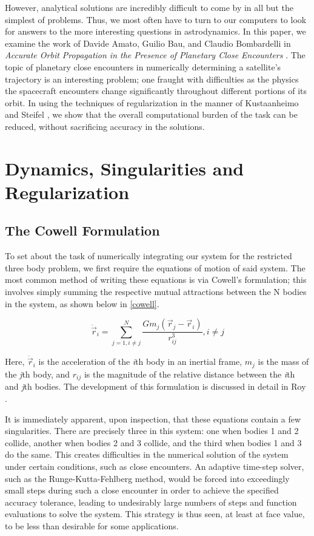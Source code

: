 \documentclass[11pt,twoside,letterpaper]{article}
\begin{document}
    However, analytical solutions are incredibly difficult to come by
    in all but the simplest of problems. Thus, we most often have to
    turn to our computers to look for answers to the more interesting
    questions in astrodynamics. In this paper, we examine the work of
    Davide Amato, Guilio Bau, and Claudio Bombardelli in \textit{Accurate
    Orbit Propagation in the Presence of Planetary Close Encounters}
    \cite{amato_2017}. The topic of planetary close encounters in
    numerically determining a satellite’s trajectory is an interesting
    problem; one fraught with difficulties as the physics the
    spacecraft encounters change significantly throughout different
    portions of its orbit. In using the techniques of regularization
    in the manner of Kustaanheimo and Steifel \cite{stiefel_1971}, we
    show that the overall computational burden of the task can be
    reduced, without sacrificing accuracy in the solutions.
    
  \section{Dynamics, Singularities and Regularization}
  
  \subsection {The Cowell Formulation} 
  To set about the task of numerically integrating our system for the
  restricted three body problem, we first require the equations of
  motion of said system. The most common method of writing these
  equations is via Cowell's formulation; this involves simply summing
  the respective mutual attractions between the N bodies in the
  system, as shown below in \ref{cowell}. 
  
  \begin{equation} \label{cowell}
    \ddot{\vec{r}}_i = \sum_{j=1, i\neq j}^{N} \frac{Gm_j\left(\vec{r}_j - \vec{r}_i\right)}{r_{ij}^3} , i \neq j
  \end{equation}

  Here, \(\ddot{\vec{r}}_i\) is the acceleration of the \textit{i}th
  body in an inertial frame, \(m_j\) is the mass of the \textit{j}th
  body, and \(r_{ij}\) is the magnitude of the relative distance
  between the \textit{i}th and \textit{j}th bodies. The development of
  this formulation is discussed in detail in Roy \cite{roy_2017}.

  It is immediately apparent, upon inspection, that these equations
  contain a few singularities. There are precisely three in this
  system: one when bodies 1 and 2 collide, another when bodies 2 and 3
  collide, and the third when bodies 1 and 3 do the same. This creates
  difficulties in the numerical solution of the system under certain
  conditions, such as close encounters. An adaptive time-step solver,
  such as the Runge-Kutta-Fehlberg method, would be forced into
  exceedingly small steps during such a close encounter in order to
  achieve the specified accuracy tolerance, leading to undesirably
  large numbers of steps and function evaluations to solve the
  system. This strategy is thus seen, at least at face value, to be
  less than desirable for some applications.
\end{document}
